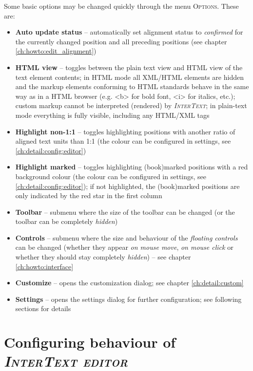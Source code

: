\documentclass[a4paper,10pt,oneside]{book}
\newcommand{\IT}{\textit{\textsc{InterText}}\xspace}
\newcommand{\ITeditor}{\textit{\textsc{InterText editor}}\xspace}
\newcommand{\menu}[1]{\textsc{#1}}
\begin{document}
Some basic options may be changed quickly through the menu \menu{Options}. These are:

\begin{itemize}
 \item \textbf{Auto update status} -- automatically set alignment status to \emph{confirmed} for the currently changed position and all preceding positions (see chapter \ref{ch:howto:edit_alignment})
 \item \textbf{HTML view} -- toggles between the plain text view and HTML view of the text element contents; in HTML mode all XML/HTML elements are hidden and the markup elements conforming to HTML standards behave in the same way as in a HTML browser (e.g. <b> for bold font, <i> for italics, etc.); custom markup cannot be interpreted (rendered) by \IT; in plain-text mode everything is fully visible, including any HTML/XML tags
 \item \textbf{Highlight non-1:1} -- toggles highlighting positions with another ratio of aligned text units than 1:1 (the colour can be configured in settings, see \ref{ch:detail:config:editor})
 \item \textbf{Highlight marked} -- toggles highlighting (book)marked positions with a red background colour (the colour can be configured in settings, see \ref{ch:detail:config:editor}); if not highlighted, the (book)marked positions are only indicated by the red star in the first column
 \item \textbf{Toolbar} -- submenu where the size of the toolbar can be changed (or the toolbar can be completely \emph{hidden})
 \item \textbf{Controls} -- submenu where the size and behaviour of the \emph{floating controls} can be changed (whether they appear \emph{on mouse move}, \emph{on mouse click} or whether they should stay completely \emph{hidden}) -- see chapter \ref{ch:howto:interface}
 \item \textbf{Customize} -- opens the customization dialog; see chapter \ref{ch:detail:custom}
 \item \textbf{Settings} -- opens the settings dialog for further configuration; see following sections for details
\end{itemize}

\section{Configuring behaviour of \ITeditor}\label{ch:detail:config:general}
\end{document}
